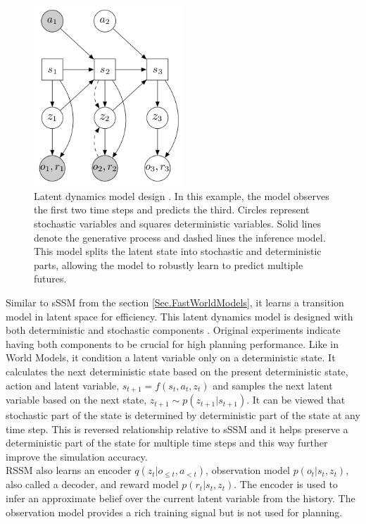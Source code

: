 \begin{figure}[H]
\includegraphics[width=0.5\textwidth,keepaspectratio]{figures/PlaNet/model.png}
\caption[PlaNet latent dynamics model design]{Latent dynamics model design \protect\cite{Algo.PlaNet}. In this example, the model observes the first two time steps and predicts the third. Circles represent stochastic variables and squares deterministic variables. Solid lines denote the generative process and dashed lines the inference model. This model splits the latent state into stochastic and deterministic parts, allowing the model to robustly learn to predict multiple futures.}
\label{Fig.PlaNetModelDesigne}
\end{figure}

Similar to sSSM from the section \ref{Sec.FastWorldModels}, it learns a transition model in latent space for efficiency. This latent dynamics model is designed with both deterministic and stochastic components \cite{Algo.FastGenerativeModels}. Original experiments indicate having both components to be crucial for high planning performance. Like in World Models, it condition a latent variable only on a deterministic state. It calculates the next deterministic state based on the present deterministic state, action and latent variable, $s_{t+1} = f(s_t, a_t, z_t)$ and samples the next latent variable based on the next state, $z_{t+1} \sim p(z_{t+1}|s_{t+1})$. It can be viewed that stochastic part of the state is determined by deterministic part of the state at any time step. This is reversed relationship relative to sSSM and it helps preserve a deterministic part of the state for multiple time steps and this way further improve the simulation accuracy. \\
RSSM also learns an encoder $q(z_t | o_{\leqslant t}, a_{< t})$, observation model $p(o_t | s_t, z_t)$, also called a decoder, and reward model $p(r_t | s_t, z_t)$. The encoder is used to infer an approximate belief over the current latent variable from the history. The observation model provides a rich training signal but is not used for planning.

